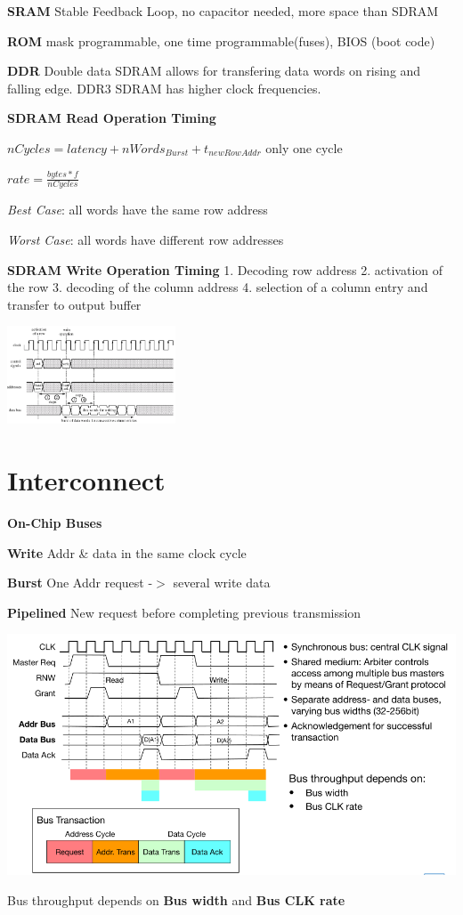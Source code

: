 \documentclass[english]{latex4ei/latex4ei_sheet}
\begin{document}
\textbf{SRAM} Stable Feedback Loop, no capacitor needed, more space than SDRAM

\textbf{ROM} mask programmable, one time programmable(fuses), BIOS (boot code)

\textbf{DDR} Double data SDRAM allows for transfering data words on rising and falling edge. DDR3 SDRAM has higher clock frequencies.

\textbf{SDRAM Read Operation Timing}

$nCycles = latency + nWords_{Burst} + t_{newRowAddr}$ \quad only one cycle

$rate = \frac{bytes * f}{nCycles}$

\textit{Best Case}: all words have the same row address

\textit{Worst Case}: all words have different row addresses

\textbf{SDRAM Write Operation Timing}
1. Decoding row address 2. activation of the row 3. decoding of the column address 4. selection of a column entry and transfer to output buffer
\begin{center}
	\includegraphics[width=5cm]{images//5.Memory/SDRAMWrite.png}
\end{center}

\section{Interconnect}

\textbf{On-Chip Buses}

\textbf{Write} Addr \& data in the same clock cycle

\textbf{Burst} One Addr request -$>$ several write data

\textbf{Pipelined} New request before completing previous transmission

\begin{center}
	\includegraphics[width=\linewidth]{images//6.Interconnects/OnChipBasicOperation.png}
\end{center}
Bus throughput depends on \textbf{Bus width} and \textbf{Bus CLK rate}
\end{document}
